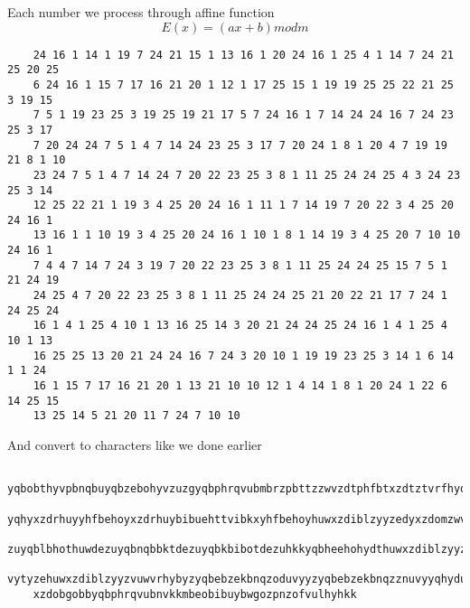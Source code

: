 \documentclass[10pt]{article}
\begin{document}
Each number we process through affine function \begin{equation} E(x) = (ax + b) mod m \end{equation}

\begin{verbatim}
	24 16 1 14 1 19 7 24 21 15 1 13 16 1 20 24 16 1 25 4 1 14 7 24 21 25 20 25 
	6 24 16 1 15 7 17 16 21 20 1 12 1 17 25 15 1 19 19 25 25 22 21 25 3 19 15 
	7 5 1 19 23 25 3 19 25 19 21 17 5 7 24 16 1 7 14 24 24 16 7 24 23 25 3 17 
	7 20 24 24 7 5 1 4 7 14 24 23 25 3 17 7 20 24 1 8 1 20 4 7 19 19 21 8 1 10 
	23 24 7 5 1 4 7 14 24 7 20 22 23 25 3 8 1 11 25 24 24 25 4 3 24 23 25 3 14 
	12 25 22 21 1 19 3 4 25 20 24 16 1 11 1 7 14 19 7 20 22 3 4 25 20 24 16 1 
	13 16 1 1 10 19 3 4 25 20 24 16 1 10 1 8 1 14 19 3 4 25 20 7 10 10 24 16 1 
	7 4 4 7 14 7 24 3 19 7 20 22 23 25 3 8 1 11 25 24 24 25 15 7 5 1 21 24 19 
	24 25 4 7 20 22 23 25 3 8 1 11 25 24 24 25 21 20 22 21 17 7 24 1 24 25 24 
	16 1 4 1 25 4 10 1 13 16 25 14 3 20 21 24 24 25 24 16 1 4 1 25 4 10 1 13 
	16 25 25 13 20 21 24 24 16 7 24 3 20 10 1 19 19 23 25 3 14 1 6 14 1 1 24 
	16 1 15 7 17 16 21 20 1 13 21 10 10 12 1 4 14 1 8 1 20 24 1 22 6 14 25 15 
	13 25 14 5 21 20 11 7 24 7 10 10 
\end{verbatim}

And convert to characters like we done earlier

\begin{verbatim}
	yqbobthyvpbnqbuyqbzebohyvzuzgyqbphrqvubmbrzpbttzzwvzdtphfbtxzdtztvrfhyqbhoy
	yqhyxzdrhuyyhfbehoyxzdrhuybibuehttvibkxyhfbehoyhuwxzdiblzyyzedyxzdomzwvbtde
	zuyqblbhothuwdezuyqbnqbbktdezuyqbkbibotdezuhkkyqbheehohydthuwxzdiblzyyzphfb
	vytyzehuwxzdiblzyyzvuwvrhybyzyqbebzekbnqzoduvyyzyqbebzekbnqzznuvyyqhydukbtt
	xzdobgobbyqbphrqvubnvkkmbeobibuybwgozpnzofvulhyhkk
\end{verbatim}
\end{document}
